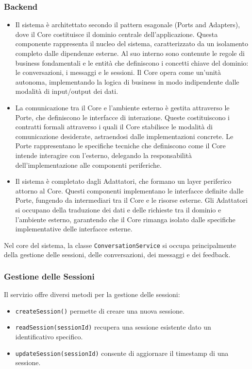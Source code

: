 \subsubsection{Backend}
\begin{itemize}
\item Il sistema è architettato secondo il pattern esagonale (Ports and Adapters), dove il Core costituisce il dominio centrale dell'applicazione. Questa componente rappresenta il nucleo del sistema, caratterizzato da un isolamento completo dalle dipendenze esterne. Al suo interno sono contenute le regole di business fondamentali e le entità che definiscono i concetti chiave del dominio: le conversazioni, i messaggi e le sessioni. Il Core opera come un'unità autonoma, implementando la logica di business in modo indipendente dalle modalità di input/output dei dati.
\item La comunicazione tra il Core e l'ambiente esterno è gestita attraverso le Porte, che definiscono le interfacce di interazione. Queste costituiscono i contratti formali attraverso i quali il Core stabilisce le modalità di comunicazione desiderate, astraendosi dalle implementazioni concrete. Le Porte rappresentano le specifiche tecniche che definiscono come il Core intende interagire con l'esterno, delegando la responsabilità dell'implementazione alle componenti periferiche.
\item Il sistema è completato dagli Adattatori, che formano un layer periferico attorno al Core. Questi componenti implementano le interfacce definite dalle Porte, fungendo da intermediari tra il Core e le risorse esterne. Gli Adattatori si occupano della traduzione dei dati e delle richieste tra il dominio e l'ambiente esterno, garantendo che il Core rimanga isolato dalle specifiche implementative delle interfacce esterne.
\end{itemize}
Nel core del sistema, la classe \texttt{ConversationService} si occupa principalmente della gestione delle sessioni, delle conversazioni, dei messaggi e dei feedback.

\subsubsection*{Gestione delle Sessioni}
Il servizio offre diversi metodi per la gestione delle sessioni:
\begin{itemize}
    \item \texttt{createSession()} permette di creare una nuova sessione.
    \item \texttt{readSession(sessionId)} recupera una sessione esistente dato un identificativo specifico.
    \item \texttt{updateSession(sessionId)} consente di aggiornare il timestamp di una sessione.
\end{itemize}

